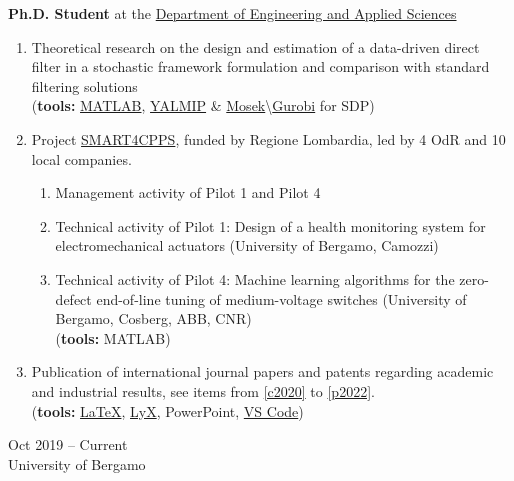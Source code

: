 \documentclass[10pt]{article}
\begin{document}
\noindent
\begin{minipage}[t]{.8\textwidth}
	\textbf{Ph.D. Student} at the \href{https://disa.unibg.it/}{Department of Engineering and Applied Sciences}
	\begin{enumerate}
		\item Theoretical research on the design and estimation of a data-driven direct filter in a stochastic framework formulation and comparison with standard filtering solutions\\
		({\scriptsize \textbf{tools:} \href{https://www.mathworks.com/products/matlab.html}{MATLAB}, \href{https://yalmip.github.io/}{YALMIP} \& \href{https://www.mosek.com/}{Mosek}\textbackslash \href{https://www.gurobi.com/}{Gurobi} for SDP})

		\item Project \href{https://www.smart4cpps.it/}{SMART4CPPS}, funded by Regione Lombardia, led by 4 OdR and 10 local companies.
		\begin{enumerate}
			\item Management activity of Pilot 1 and Pilot 4
			\item Technical activity of Pilot 1: Design of a health monitoring system for electromechanical actuators ({\small University of Bergamo, Camozzi})
			\item Technical activity of Pilot 4: Machine learning algorithms for the zero-defect end-of-line tuning of medium-voltage switches ({\small University of Bergamo, Cosberg, ABB, CNR})\\
			({\scriptsize \textbf{tools:} MATLAB})
		\end{enumerate}
		\item Publication of international journal papers and patents regarding academic and industrial results, see items from \ref{c2020} to \ref{p2022}.\\
		({\scriptsize \textbf{tools:} \href{https://www.latex-project.org/}{LaTeX}, \href{https://www.lyx.org/LyX}{LyX}, PowerPoint, \href{https://code.visualstudio.com/}{VS Code}})
	\end{enumerate}
\end{minipage}%
\hfill\vrule\hfill
\begin{minipage}[t]{.16\textwidth}
	\raggedleft
	Oct 2019 – Current\\
	{\small University of Bergamo}
\end{minipage}

\vspace{6pt} %
\end{document}
